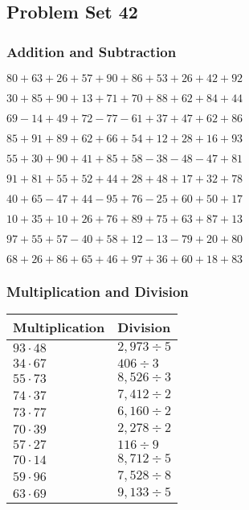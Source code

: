 \hypertarget{problem-set-42}{%
\subsection{Problem Set 42}\label{problem-set-42}}

\hypertarget{addition-and-subtraction}{%
\subsubsection{Addition and
Subtraction}\label{addition-and-subtraction}}

\(80+63+26+57+90+86+53+26+42+92\)

\(30+85+90+13+71+70+88+62+84+44\)

\(69-14+49+72-77-61+37+47+62+86\)

\(85+91+89+62+66+54+12+28+16+93\)

\(55+30+90+41+85+58-38-48-47+81\)

\(91+81+55+52+44+28+48+17+32+78\)

\(40+65-47+44-95+76-25+60+50+17\)

\(10+35+10+26+76+89+75+63+87+13\)

\(97+55+57-40+58+12-13-79+20+80\)

\(68+26+86+65+46+97+36+60+18+83\)

\hypertarget{multiplication-and-division}{%
\subsubsection{Multiplication and
Division}\label{multiplication-and-division}}

\begin{longtable}[]{@{}ll@{}}
\toprule
Multiplication & Division\tabularnewline
\midrule
\endhead
\(93\cdot48\) & \(2,973÷5\)\tabularnewline
\(34\cdot67\) & \(406÷3\)\tabularnewline
\(55\cdot73\) & \(8,526÷3\)\tabularnewline
\(74\cdot37\) & \(7,412÷2\)\tabularnewline
\(73\cdot77\) & \(6,160÷2\)\tabularnewline
\(70\cdot39\) & \(2,278÷2\)\tabularnewline
\(57\cdot27\) & \(116 ÷9\)\tabularnewline
\(70\cdot14\) & \(8,712÷5\)\tabularnewline
\(59\cdot96\) & \(7,528÷8\)\tabularnewline
\(63\cdot69\) & \(9,133÷5\)\tabularnewline
\bottomrule
\end{longtable}
